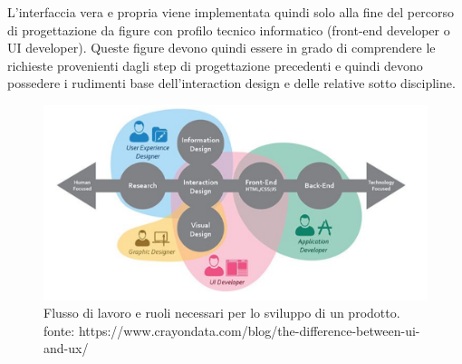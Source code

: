 L'interfaccia vera e propria viene implementata quindi solo alla fine del percorso di progettazione da figure con profilo tecnico informatico (front-end developer o UI developer). Queste figure devono quindi essere in grado di comprendere le richieste provenienti dagli step di progettazione precedenti e quindi devono possedere i rudimenti base dell'interaction design e delle relative sotto discipline.

\begin{figure}[!h]
	\centering
	\includegraphics[width=\textwidth]{immagini/UX_and_UI.png}
	\caption{Flusso di lavoro e ruoli necessari per lo sviluppo di un prodotto. fonte: https://www.crayondata.com/blog/the-difference-between-ui-and-ux/
}
\end{figure}

